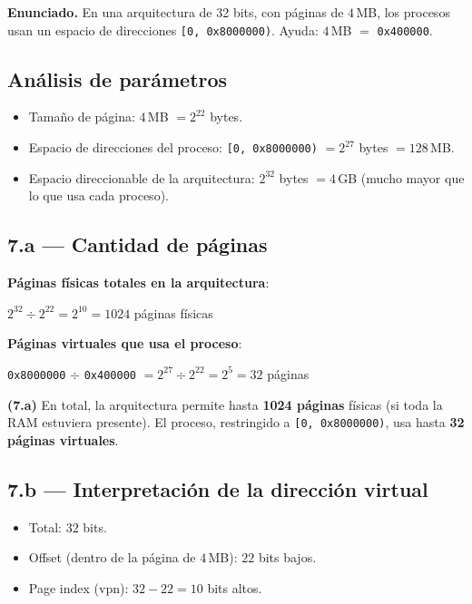 \documentclass[11pt,a4paper]{article}
\begin{document}
\textbf{Enunciado.} En una arquitectura de 32 bits, con páginas de
$4$\,MB, los procesos usan un espacio de direcciones
\texttt{[0, 0x8000000)}. Ayuda: $4$\,MB $=$ \texttt{0x400000}.

\subsection*{Análisis de parámetros}

\begin{itemize}[leftmargin=*,nosep]
    \item Tamaño de página: $4$\,MB $= 2^{22}$ bytes.
    \item Espacio de direcciones del proceso:
        \texttt{[0, 0x8000000)} $= 2^{27}$ bytes $= 128$\,MB.
    \item Espacio direccionable de la arquitectura: $2^{32}$ bytes $=
        4$\,GB (mucho mayor que lo que usa cada proceso).
\end{itemize}

\subsection*{7.a --- Cantidad de páginas}

\textbf{Páginas físicas totales en la arquitectura}:

\quad $2^{32} \div 2^{22} = 2^{10} = 1024$ páginas físicas

\textbf{Páginas virtuales que usa el proceso}:

\quad \texttt{0x8000000} $\div$ \texttt{0x400000} $= 2^{27} \div 2^{22} = 2^5 = 32$ páginas

\begin{respuesta}
\textbf{(7.a)} En total, la arquitectura permite hasta
\textbf{1024 páginas} físicas (si toda la RAM estuviera presente).
El proceso, restringido a \texttt{[0, 0x8000000)}, usa hasta
\textbf{32 páginas virtuales}.
\end{respuesta}

\subsection*{7.b --- Interpretación de la dirección virtual}

\begin{itemize}[leftmargin=*,nosep]
    \item Total: $32$ bits.
    \item Offset (dentro de la página de $4$\,MB): $22$ bits bajos.
    \item Page index (vpn): $32 - 22 = 10$ bits altos.
\end{itemize}
\end{document}
